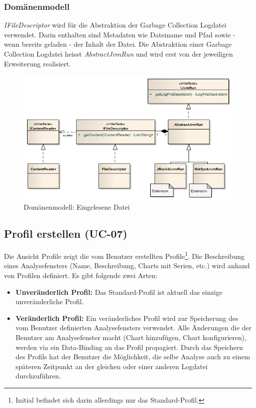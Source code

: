 \subsubsection{Domänenmodell}
\textit{IFileDescriptor} wird für die Abstraktion der Garbage Collection Logdatei verwendet. Darin enthalten sind Metadaten wie Dateiname und Pfad sowie - wenn bereits geladen - der Inhalt der Datei. Die Abstraktion einer Garbage Collection Logdatei heisst \textit{AbstractJvmRun} und wird erst von der jeweiligen Erweiterung realisiert.
 \begin{figure}[H]
  	\centering
    	\includegraphics[width=16cm]{images/core_domain}
        	\caption{Domänenmodell: Eingelesene Datei}
\end{figure}


\subsection{Profil erstellen (UC-07)}
Die Ansicht Profile zeigt die vom Benutzer erstellten Profile\footnote{Initial befindet sich darin allerdings nur das Standard-Profil.}. Die Beschreibung eines Analysefensters (Name, Beschreibung, Charts mit Serien, etc.) wird anhand von Profilen definiert. Es gibt folgende zwei Arten:
\begin{itemize}
	\item \textbf{Unveränderlich Profil:} Das Standard-Profil ist aktuell das einzige unveränderliche Profil.
	\item \textbf{Veränderlich Profil:} Ein veränderliches Profil wird zur Speicherung des vom Benutzer definierten Analysefensters verwendet. Alle Änderungen die der Benutzer am Analysefenster macht (Chart hinzufügen, Chart konfigurieren), werden via ein Data-Binding an das Profil propagiert. Durch das Speichern des Profils hat der Benutzer die Möglichkeit, die selbe Analyse auch zu einem späteren Zeitpunkt an der gleichen oder einer anderen Logdatei durchzuführen.
\end{itemize}

